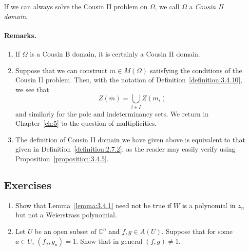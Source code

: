 If we can always solve the Cousin II problem on $\Omega$, we call $\Omega$ a \emph{Cousin II domain}.
\paragraph*{Remarks.}
\begin{enumerate}
\item If $\Omega$ is a Cousin B domain, it is certainly a Cousin II domain.
\item Suppose that we can construct $m\in M(\Omega)$ satisfying the conditions of the Cousin II problem. Then, with the notation of Definition~\ref{definition:3.4.10}, we see that
\[Z(m)=\bigcup_{i\in I}Z(m_i)\]
and similarly for the pole and indeterminancy sets. We return in Chapter~\ref{ch:5} to the question of multiplicities.
\item The definition of Cousin II domain we have given above is equivalent to that given in Definition~\ref{definition:2.7.2}, as the reader may easily verify using Proposition~\ref{proposition:3.4.5}.
\end{enumerate}
\subsection*{Exercises}
\begin{enumerate}
\item Show that Lemma~\ref{lemma:3.4.1} need not be true if $W$ is a polynomial in $z_n$ but not a Weierstrass polynomial.
\item Let $U$ be an open subset of $\mathbb C^n$ and $f,g\in A(U)$. Suppose that for some $a\in U$, $(f_a,g_a)=1$. Show that in general $(f,g)\ne1$.
\end{enumerate}
